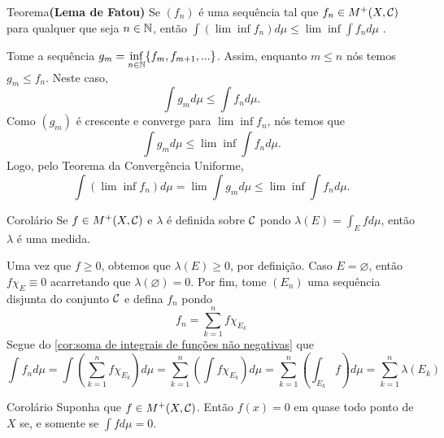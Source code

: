 \begin{env}{Teorema}\textbf{(Lema de Fatou)}
	\label{teo:lema de fatou}
	Se $(f_n)$ é uma sequência tal que $f_n \in M^+(X, \operatorname{\mathcal{C}})$ para qualquer que seja $n \in \operatorname{\mathbb{N}}$, então 
	$\displaystyle
	\int(\lim \inf f_n)d\mu \leq \lim \inf \int f_n d\mu$ \cite{bartle}. 
\end{env}
\begin{prova}
	Tome a sequência $g_m = \displaystyle \inf_{n \in \operatorname{\mathbb{N}}}\{f_m, f_{m+1},...\}$.
	Assim, enquanto $m\leq n$ nós temos $g_m \leq f_n$.
	Neste caso,
	$$
	\int g_m d\mu \leq \int f_n d\mu.
	$$
	Como $(g_m)$ é crescente e converge para $\lim\inf f_n$, nós temos que 
	$$
	\int g_m d\mu \leq \lim \inf \int f_n d\mu.
	$$
	Logo, pelo Teorema da Convergência Uniforme,
	$$
	\int (\lim \inf f_n)d\mu = \lim \int g_m d\mu \leq \lim \inf \int f_n d\mu.
	$$ 
\end{prova}
  
\begin{env}{Corolário}
	Se $f \in M^+(X, \operatorname{\mathcal{C}})$ e $\lambda$ é definida sobre $\operatorname{\mathcal{C}}$ pondo
	$
	\displaystyle\lambda(E) = \int_E fd\mu 
	$,
	então $\lambda$ é uma medida.
\end{env}

\begin{prova}
	Uma vez que $f \geq 0$, obtemos que $\lambda(E) \geq 0$, por definição.
	Caso $E = \varnothing$, então $f\chi_E \equiv 0$ acarretando que $\lambda(\varnothing) = 0$.
	Por fim, tome $(E_n)$ uma sequência disjunta do conjunto $\operatorname{\mathcal{C}}$ e defina
	$f_n$ pondo
	$$
	f_n = \sum_{k =1}^nf\chi_{E_k}
	$$
	Segue do \ref{cor:soma de integrais de funções não negativas} que
	$$
	\int f_n d\mu
	= \int \left(\sum_{k =1}^nf\chi_{E_k}\right) d\mu
	= \sum_{k =1}^n \left(\int f\chi_{E_k}\right) d\mu
	= \sum_{k =1}^n \left(\int_{E_k} f\right) d\mu
	= \sum_{k =1}^n \lambda(E_k)
	$$
\end{prova}




\begin{env}{Corolário}
	Suponha que $f \in M^+(X, \operatorname{\mathcal{C}})$. Então
	$f(x) = 0$ em quase todo ponto de $X$ se, e somente se $\displaystyle \int fd\mu = 0$.
\end{env}


